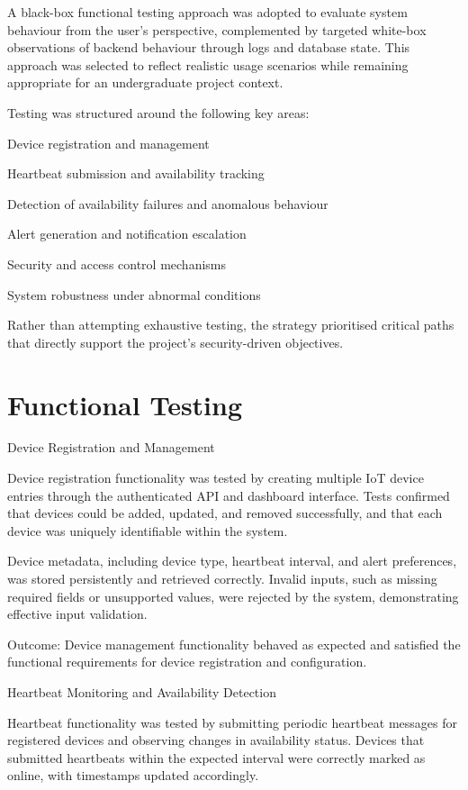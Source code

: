 A black-box functional testing approach was adopted to evaluate system behaviour from the user's perspective, complemented by targeted white-box observations of backend behaviour through logs and database state. This approach was selected to reflect realistic usage scenarios while remaining appropriate for an undergraduate project context.

Testing was structured around the following key areas:

Device registration and management

Heartbeat submission and availability tracking

Detection of availability failures and anomalous behaviour

Alert generation and notification escalation

Security and access control mechanisms

System robustness under abnormal conditions

Rather than attempting exhaustive testing, the strategy prioritised critical paths that directly support the project's security-driven objectives.

\section{Functional Testing}

Device Registration and Management

Device registration functionality was tested by creating multiple IoT device entries through the authenticated API and dashboard interface. Tests confirmed that devices could be added, updated, and removed successfully, and that each device was uniquely identifiable within the system.

Device metadata, including device type, heartbeat interval, and alert preferences, was stored persistently and retrieved correctly. Invalid inputs, such as missing required fields or unsupported values, were rejected by the system, demonstrating effective input validation.

Outcome: Device management functionality behaved as expected and satisfied the functional requirements for device registration and configuration.

Heartbeat Monitoring and Availability Detection

Heartbeat functionality was tested by submitting periodic heartbeat messages for registered devices and observing changes in availability status. Devices that submitted heartbeats within the expected interval were correctly marked as online, with timestamps updated accordingly.

